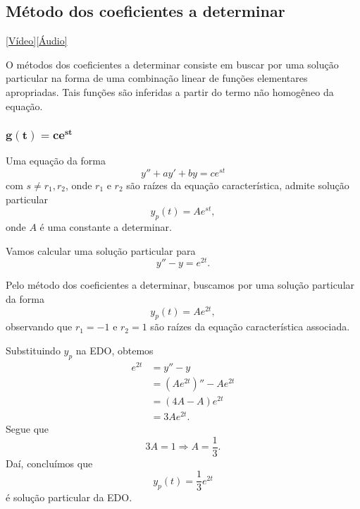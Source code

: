 \subsection{Método dos coeficientes a determinar}\label{subsec:edolin_o2_mcc}

\begin{flushright}
  \href{https://archive.org/details/edo-ordem-2-mcd}{[Vídeo]}\href{https://archive.org/details/ss-3-3-2-metodo-dos-coeficientes-a-determinar}{[Áudio]}
\end{flushright}

O métodos dos coeficientes a determinar consiste em buscar por uma solução particular na forma de uma combinação linear de funções elementares apropriadas. Tais funções são inferidas a partir do termo não homogêneo da equação.

\subsubsection{$\pmb{g(t) = ce^{st}}$}

Uma equação da forma
\begin{equation}
  y'' + ay' + by = ce^{st}
\end{equation}
com $s\neq r_1,r_2$, onde $r_1$ e $r_2$ são raízes da equação característica, admite solução particular
\begin{equation}
  y_p(t) = Ae^{st},
\end{equation}
onde $A$ é uma constante a determinar.

\begin{ex}
  Vamos calcular uma solução particular para
  \begin{equation}
    y'' - y = e^{2t}.
  \end{equation}

  Pelo método dos coeficientes a determinar, buscamos por uma solução particular da forma
  \begin{equation}
    y_p(t) = Ae^{2t},
  \end{equation}
  observando que $r_1=-1$ e $r_2=1$ são raízes da equação característica associada.

  Substituindo $y_p$ na EDO, obtemos
  \begin{align}
    e^{2t} &= y'' - y \\
           &= \left(Ae^{2t}\right)'' - Ae^{2t} \\
           &= (4A - A)e^{2t} \\
           &= 3Ae^{2t}.
  \end{align}
  Segue que
  \begin{equation}
    3A = 1 \Rightarrow A = \frac{1}{3}.
  \end{equation}
  Daí, concluímos que
  \begin{equation}
    y_p(t) = \frac{1}{3}e^{2t}
  \end{equation}
  é solução particular da EDO.
\end{ex}

